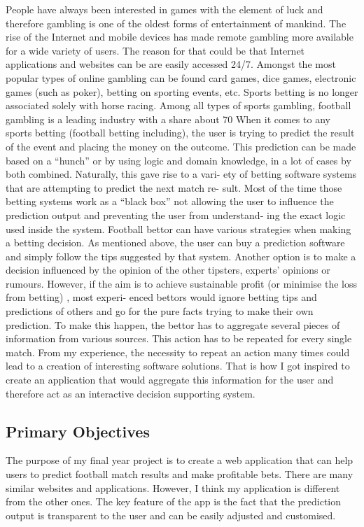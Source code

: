 People have always been interested in games with the element of luck and therefore gambling is one of the oldest forms of entertainment of mankind. The rise of the Internet and mobile devices has made remote gambling more available for a wide variety of users. The reason for that could be that Internet applications and websites can be are easily accessed 24/7. Amongst the most popular types of online gambling can be found card games, dice games, electronic games (such as poker), betting on sporting events, etc.
Sports betting is no longer associated solely with horse racing. Among all types of sports gambling, football gambling is a leading industry with a share about 70%
When it comes to any sports betting (football betting including), the user is trying to predict the result of the event and placing the money on the outcome. This prediction can be made based on a “hunch” or by using logic and domain knowledge, in a lot of cases by both combined. Naturally, this gave rise to a vari- ety of betting software systems that are attempting to predict the next match re- sult. Most of the time those betting systems work as a “black box” not allowing the user to influence the prediction output and preventing the user from understand- ing the exact logic used inside the system.
Football bettor can have various strategies when making a betting decision. As mentioned above, the user can buy a prediction software and simply follow the tips suggested by that system. Another option is to make a decision influenced by the opinion of the other tipsters, experts’ opinions or rumours. However, if the aim is to achieve sustainable profit (or minimise the loss from betting) , most experi- enced bettors would ignore betting tips and predictions of others and go for the pure facts trying to make their own prediction. To make this happen, the bettor has to aggregate several pieces of information from various sources. This action has to be repeated for every single match.
From my experience, the necessity to repeat an action many times could lead to a creation of interesting software solutions. That is how I got inspired to create an application that would aggregate this information for the user and therefore act as an interactive decision supporting system.

\subsection{Primary Objectives}
\label{sec:primaryobjectives}
The purpose of my final year project is to create a web application that can help users to predict football match results and make profitable bets. There are many similar websites and applications. However, I think my application is different from the other ones. The key feature of the app is the fact that the prediction output is transparent to the user and can be easily adjusted and customised. 


